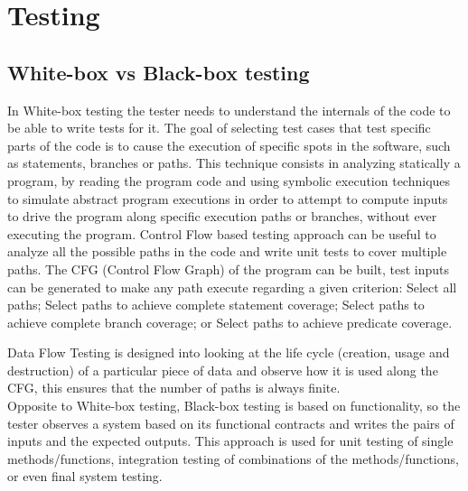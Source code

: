 \chapter{Testing}
\minitoc


\section{White-box vs Black-box testing}
In White-box testing the tester needs to understand the internals of
the code to be able to write tests for it.
The goal of selecting test cases that test specific parts of the code
is to cause the execution of specific spots in the software, such as
statements, branches or
paths.
This technique consists in analyzing statically a program, by reading
the program code and using symbolic execution techniques to simulate
abstract program
executions in order to attempt to compute inputs to drive the program
along specific execution paths or branches, without ever executing the
program. Control Flow based testing approach can be useful to analyze all the
possible paths in the code and write unit tests to cover multiple paths.
The CFG (Control Flow Graph) of the program can be built,
test inputs can be generated to make any path execute regarding a given criterion:
Select all paths;
Select paths to achieve complete statement
coverage\cite{stt,Ntafos:1988:CST:630792.631017};
Select paths to achieve complete branch coverage\cite{Roper1994,stt};
or Select paths to achieve predicate
coverage\cite{stt,Ntafos:1988:CST:630792.631017}.

Data Flow Testing is designed into looking at the life cycle
(creation, usage and destruction) of a particular
piece of data and observe how it is used along the CFG, this ensures
that the number of paths is always finite\cite{dataflow}.\\

Opposite to White-box testing, Black-box testing is based on
functionality, so the tester observes a system based
on its functional contracts and writes the pairs of inputs and the
expected outputs.
This approach is used for unit testing of single methods/functions,
integration testing
of combinations of the methods/functions, or even final system testing.\\

